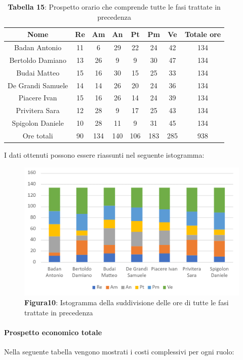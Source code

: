 \begin{table}[H]
	\centering
	\renewcommand{\arraystretch}{1.5}
	\begin{tabular}{|c|c|c|c|c|c|c|c|}
		\hline
		\rowcolor{lighter-grayer}
		Nome & Re & Am & An & Pt & Pm & Ve & Totale ore\\
		\hline
		Badan Antonio & 11 & 6 & 29 & 22 & 24 & 42 & 134 \\
		\hline
		Bertoldo Damiano & 13 & 26 & 9 & 9 & 30 & 47 & 134 \\
		\hline
		Budai Matteo & 15 & 16 & 30 & 15 & 25 & 33 & 134 \\
		\hline
		De Grandi Samuele & 14 & 14 & 26 & 20 & 24 & 36 & 134 \\
		\hline
		Piacere Ivan & 15 & 16 & 26 & 14 & 24 & 39 & 134 \\
		\hline
		Privitera Sara & 12 & 28 & 9 & 17 & 25 & 43 & 134 \\
		\hline
		Spigolon Daniele & 10 & 28 & 11 & 9 & 31 & 45 & 134 \\
		\hline
		Ore totali & 90 & 134 & 140 & 106 & 183 & 285 & 938 \\
		\hline
	\end{tabular}
	\caption*{\textbf{Tabella 15}: Prospetto orario che comprende tutte le fasi trattate in precedenza\\}
\end{table}	
I dati ottenuti possono essere riassunti nel seguente istogramma:

\begin{figure}[H]
	\centering
	\includegraphics[width=0.7\linewidth]{res/images/IstogrammaTotale.png}
	\caption*{\textbf{Figura10}: Istogramma della suddivisione delle ore di tutte le fasi trattate in precedenza}
	\label{fig:Figura10}
\end{figure}

\paragraph{Prospetto economico totale}
Nella seguente tabella vengono mostrati i costi complessivi per ogni ruolo:

